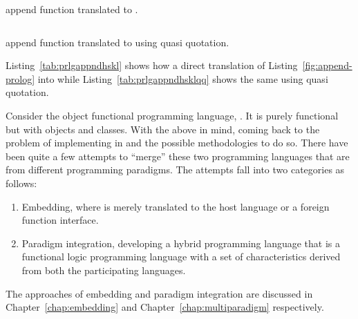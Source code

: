 \documentclass[thesis-solanki.tex]{subfiles}
\begin{document}
\begin{code-list}[th]
  \begin{singlespace}
    \inputminted[linenos]{haskell}{append_no_quasi.hs}
  \end{singlespace}
  \caption{ append function translated to .}
\label{tab:prlgappndhskl}
\end{code-list}

\begin{code-list}[th]
  \begin{singlespace}
    \inputminted[linenos]{haskell}{append_quasi_quote.hs}
  \end{singlespace}
  \caption{ append function translated to  using quasi quotation.}
\label{tab:prlgappndhsklqq}
\end{code-list}



Listing~\ref{tab:prlgappndhskl} shows how a direct translation of Listing~\ref{fig:append-prolog} into  while 
Listing~\ref{tab:prlgappndhsklqq} shows the same using quasi quotation. 

Consider the object functional programming language, 
\cite{website:scala}.
It is purely functional but with objects and classes.
With the above in mind, coming back to the problem of implementing  in  and the possible 
methodologies to do so.
There have been quite a few attempts to ``merge'' these two programming languages that are from different programming
paradigms.
The attempts fall into two categories as follows:

\begin{enumerate}
\item
  Embedding, where  is merely translated to the host language  or a foreign
  function interface.

\item
  Paradigm integration, developing a hybrid programming language that is a functional logic programming language
  with a set of characteristics derived from both the participating languages.
\end{enumerate}

The approaches of embedding and paradigm integration are discussed in Chapter~\ref{chap:embedding} and Chapter~\ref{chap:multiparadigm} 
respectively.  
\end{document}
